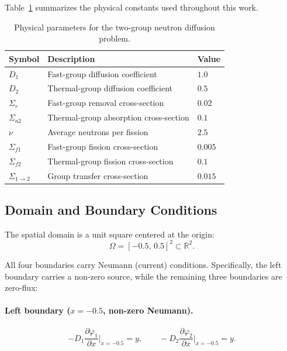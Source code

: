 Table~\ref{tab:params} summarizes the physical constants used throughout this work.

\begin{table}[h]
\centering
\caption{Physical parameters for the two-group neutron diffusion problem.}
\label{tab:params}
\begin{tabular}{@{}lll@{}}
\toprule
Symbol & Description & Value \\
\midrule
$D_1$               & Fast-group diffusion coefficient        & $1.0$   \\
$D_2$               & Thermal-group diffusion coefficient     & $0.5$   \\
$\Sigma_r$          & Fast-group removal cross-section        & $0.02$  \\
$\Sigma_{a2}$       & Thermal-group absorption cross-section  & $0.1$   \\
$\nu$               & Average neutrons per fission            & $2.5$   \\
$\Sigma_{f1}$       & Fast-group fission cross-section        & $0.005$ \\
$\Sigma_{f2}$       & Thermal-group fission cross-section     & $0.1$   \\
$\Sigma_{1\to2}$    & Group transfer cross-section            & $0.015$ \\
\bottomrule
\end{tabular}
\end{table}

\subsection{Domain and Boundary Conditions}
\label{sec:boundary}

The spatial domain is a unit square centered at the origin:
\begin{equation}
\label{eq:domain}
\Omega = [-0.5,\, 0.5]^2 \subset \mathbb{R}^2.
\end{equation}

All four boundaries carry Neumann (current) conditions. Specifically, the left boundary carries a non-zero source, while the remaining three boundaries are zero-flux:

\paragraph{Left boundary ($x = -0.5$, non-zero Neumann).}
\begin{equation}
\label{eq:bc_left}
-D_1 \frac{\partial \varphi_1}{\partial x}\bigg|_{x=-0.5} = y,
\qquad
-D_2 \frac{\partial \varphi_2}{\partial x}\bigg|_{x=-0.5} = y.
\end{equation}

